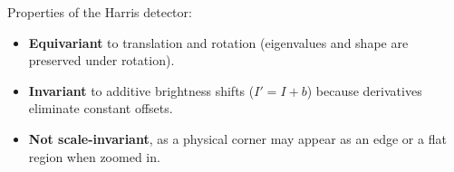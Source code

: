 Properties of the Harris detector:
\begin{itemize}
    \item \textbf{Equivariant} to translation and rotation (eigenvalues and shape are preserved under rotation).
    \item \textbf{Invariant} to additive brightness shifts ($I' = I + b$) because derivatives eliminate constant offsets.
    \item \textbf{Not scale-invariant}, as a physical corner may appear as an edge or a flat region when zoomed in.
\end{itemize}